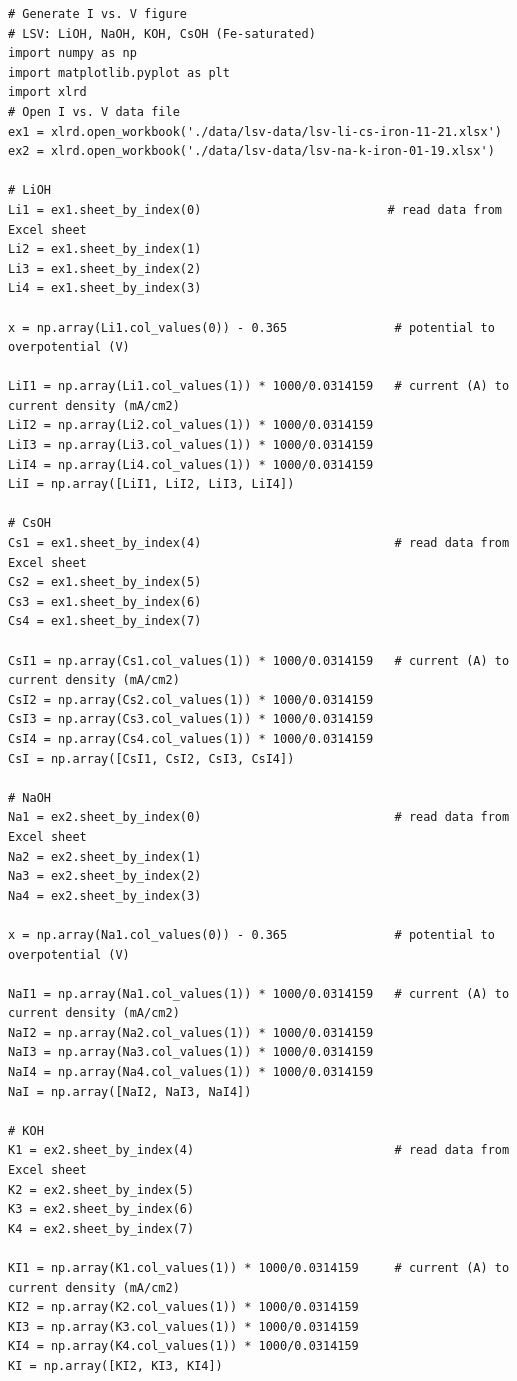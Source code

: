 \documentclass[journal=jpccck,manuscript=suppinfo,email=true]{achemso}
\begin{document}
\begin{verbatim}
# Generate I vs. V figure
# LSV: LiOH, NaOH, KOH, CsOH (Fe-saturated)
import numpy as np
import matplotlib.pyplot as plt
import xlrd
# Open I vs. V data file
ex1 = xlrd.open_workbook('./data/lsv-data/lsv-li-cs-iron-11-21.xlsx')
ex2 = xlrd.open_workbook('./data/lsv-data/lsv-na-k-iron-01-19.xlsx')

# LiOH
Li1 = ex1.sheet_by_index(0)                          # read data from Excel sheet
Li2 = ex1.sheet_by_index(1)
Li3 = ex1.sheet_by_index(2)
Li4 = ex1.sheet_by_index(3)

x = np.array(Li1.col_values(0)) - 0.365               # potential to overpotential (V)

LiI1 = np.array(Li1.col_values(1)) * 1000/0.0314159   # current (A) to current density (mA/cm2)
LiI2 = np.array(Li2.col_values(1)) * 1000/0.0314159
LiI3 = np.array(Li3.col_values(1)) * 1000/0.0314159
LiI4 = np.array(Li4.col_values(1)) * 1000/0.0314159
LiI = np.array([LiI1, LiI2, LiI3, LiI4])

# CsOH
Cs1 = ex1.sheet_by_index(4)                           # read data from Excel sheet
Cs2 = ex1.sheet_by_index(5)
Cs3 = ex1.sheet_by_index(6)
Cs4 = ex1.sheet_by_index(7)

CsI1 = np.array(Cs1.col_values(1)) * 1000/0.0314159   # current (A) to current density (mA/cm2)
CsI2 = np.array(Cs2.col_values(1)) * 1000/0.0314159
CsI3 = np.array(Cs3.col_values(1)) * 1000/0.0314159
CsI4 = np.array(Cs4.col_values(1)) * 1000/0.0314159
CsI = np.array([CsI1, CsI2, CsI3, CsI4])

# NaOH
Na1 = ex2.sheet_by_index(0)                           # read data from Excel sheet
Na2 = ex2.sheet_by_index(1)
Na3 = ex2.sheet_by_index(2)
Na4 = ex2.sheet_by_index(3)

x = np.array(Na1.col_values(0)) - 0.365               # potential to overpotential (V)

NaI1 = np.array(Na1.col_values(1)) * 1000/0.0314159   # current (A) to current density (mA/cm2)
NaI2 = np.array(Na2.col_values(1)) * 1000/0.0314159
NaI3 = np.array(Na3.col_values(1)) * 1000/0.0314159
NaI4 = np.array(Na4.col_values(1)) * 1000/0.0314159
NaI = np.array([NaI2, NaI3, NaI4])

# KOH
K1 = ex2.sheet_by_index(4)                            # read data from Excel sheet
K2 = ex2.sheet_by_index(5)
K3 = ex2.sheet_by_index(6)
K4 = ex2.sheet_by_index(7)

KI1 = np.array(K1.col_values(1)) * 1000/0.0314159     # current (A) to current density (mA/cm2)
KI2 = np.array(K2.col_values(1)) * 1000/0.0314159
KI3 = np.array(K3.col_values(1)) * 1000/0.0314159
KI4 = np.array(K4.col_values(1)) * 1000/0.0314159
KI = np.array([KI2, KI3, KI4])


\end{verbatim}
\end{document}
